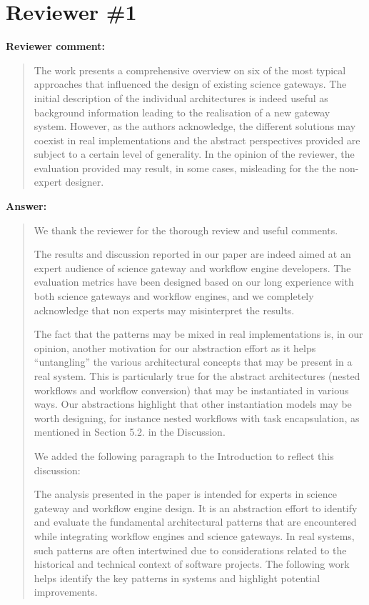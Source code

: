 \documentclass[a4]{article}
\newenvironment{review}%
{\textbf{Reviewer comment:}\begin{quote}}%
{\end{quote}}%
\newenvironment{answer}%
{\textbf{Answer:}\begin{small}\begin{quote}}%
{\end{quote}\end{small}}%
\newcommand{\revised}[1]{\color{blue} #1\color{black}}
\begin{document}
\section{Reviewer \#1}

\begin{review}
  The work presents a comprehensive overview on six of the most
  typical approaches that influenced the design of existing science
  gateways. The initial description of the individual architectures is
  indeed useful as background information leading to the realisation
  of a new gateway system. However, as the authors acknowledge, the
  different solutions may coexist in real implementations and the
  abstract perspectives provided are subject to a certain level of
  generality. In the opinion of the reviewer, the evaluation provided
  may result, in some cases, misleading for the the non-expert
  designer.
\end{review}

\begin{answer}

  We thank the reviewer for the thorough review and useful comments.

  The results and discussion reported in our paper are indeed aimed at
  an expert audience of science gateway and workflow engine
  developers. The evaluation metrics have been designed based on our
  long experience with both science gateways and workflow engines, and
  we completely acknowledge that non experts may misinterpret the
  results.

  The fact that the patterns may be mixed in real implementations is,
  in our opinion, another motivation for our abstraction effort as it
  helps ``untangling'' the various architectural concepts that may be
  present in a real system. This is particularly true for the abstract
  architectures (nested workflows and workflow conversion) that may be
  instantiated in various ways. Our abstractions highlight that other
  instantiation models may be worth designing, for instance nested
  workflows with task encapsulation, as mentioned in Section 5.2. in
  the Discussion.

  We added the following paragraph to the Introduction to reflect this discussion:

\revised{The analysis presented in the paper is intended for
experts in science gateway and workflow engine design. It is an
abstraction effort to identify and evaluate the fundamental
architectural patterns that are encountered while integrating workflow
engines and science gateways. In real systems, such patterns are often
intertwined due to considerations related to the historical and
technical context of software projects. The following work helps
identify the key patterns in systems and highlight potential
improvements.}

\end{answer}
\end{document}
